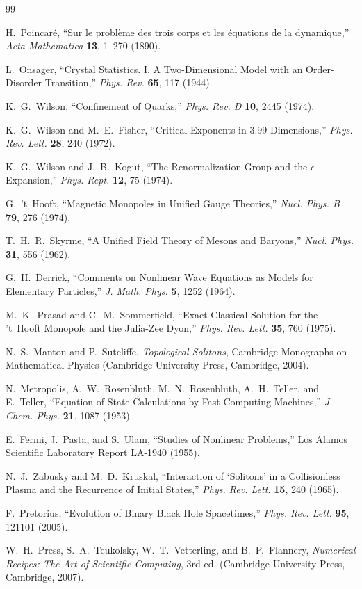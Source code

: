 \documentclass[11pt]{article}
\begin{document}
\begin{thebibliography}{99}

H.~Poincar\'e, ``Sur le probl\`eme des trois corps et les \'equations de la dynamique,'' \emph{Acta Mathematica} \textbf{13}, 1--270 (1890).

L.~Onsager, ``Crystal Statistics. I. A Two-Dimensional Model with an Order-Disorder Transition,'' \emph{Phys. Rev.} \textbf{65}, 117 (1944).

K.~G.~Wilson, ``Confinement of Quarks,'' \emph{Phys. Rev. D} \textbf{10}, 2445 (1974).

K.~G.~Wilson and M.~E.~Fisher, ``Critical Exponents in 3.99 Dimensions,'' \emph{Phys. Rev. Lett.} \textbf{28}, 240 (1972).

K.~G.~Wilson and J.~B.~Kogut, ``The Renormalization Group and the $\epsilon$ Expansion,'' \emph{Phys. Rept.} \textbf{12}, 75 (1974).

G.~'t~Hooft, ``Magnetic Monopoles in Unified Gauge Theories,'' \emph{Nucl. Phys. B} \textbf{79}, 276 (1974).

T.~H.~R.~Skyrme, ``A Unified Field Theory of Mesons and Baryons,'' \emph{Nucl. Phys.} \textbf{31}, 556 (1962).

G.~H.~Derrick, ``Comments on Nonlinear Wave Equations as Models for Elementary Particles,'' \emph{J. Math. Phys.} \textbf{5}, 1252 (1964).

M.~K.~Prasad and C.~M.~Sommerfield, ``Exact Classical Solution for the 't~Hooft Monopole and the Julia-Zee Dyon,'' \emph{Phys. Rev. Lett.} \textbf{35}, 760 (1975).

N.~S.~Manton and P.~Sutcliffe, \emph{Topological Solitons}, Cambridge Monographs on Mathematical Physics (Cambridge University Press, Cambridge, 2004).

N.~Metropolis, A.~W.~Rosenbluth, M.~N.~Rosenbluth, A.~H.~Teller, and E.~Teller, ``Equation of State Calculations by Fast Computing Machines,'' \emph{J. Chem. Phys.} \textbf{21}, 1087 (1953).

E.~Fermi, J.~Pasta, and S.~Ulam, ``Studies of Nonlinear Problems,'' Los Alamos Scientific Laboratory Report LA-1940 (1955).

N.~J.~Zabusky and M.~D.~Kruskal, ``Interaction of `Solitons' in a Collisionless Plasma and the Recurrence of Initial States,'' \emph{Phys. Rev. Lett.} \textbf{15}, 240 (1965).

F.~Pretorius, ``Evolution of Binary Black Hole Spacetimes,'' \emph{Phys. Rev. Lett.} \textbf{95}, 121101 (2005).

W.~H.~Press, S.~A.~Teukolsky, W.~T.~Vetterling, and B.~P.~Flannery, \emph{Numerical Recipes: The Art of Scientific Computing}, 3rd ed. (Cambridge University Press, Cambridge, 2007).

\end{thebibliography}
\end{document}
